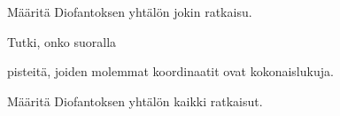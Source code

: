 \begin{tehtava}
    Määritä Diofantoksen yhtälön jokin ratkaisu.
    
    \begin{alakohdat}
    \end{alakohdat}

    \begin{vastaus}
        \begin{alakohdat}
        \end{alakohdat}
    \end{vastaus}
    
\end{tehtava}

\begin{tehtava}
    Tutki, onko suoralla
    \begin{alakohdat}
    \end{alakohdat}
    pisteitä, joiden molemmat koordinaatit ovat kokonaislukuja.

    \begin{vastaus}
        \begin{alakohdat}
        \end{alakohdat}
    \end{vastaus}
    
\end{tehtava}

\begin{tehtava}
    Määritä Diofantoksen yhtälön kaikki ratkaisut.
    
    \begin{alakohdat}
    \end{alakohdat}

    \begin{vastaus}
        \begin{alakohdat}
        \end{alakohdat}
    \end{vastaus}
    
\end{tehtava}

